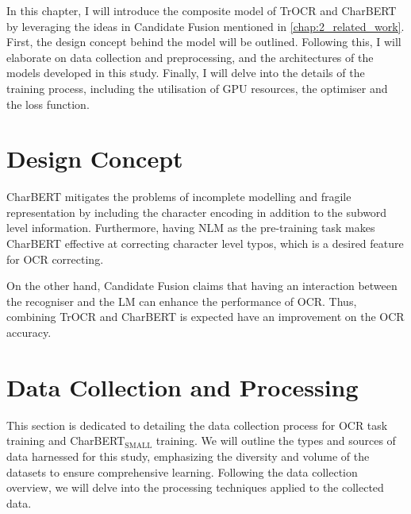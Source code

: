 \label{chap:3_method}
In this chapter, I will introduce the composite model of TrOCR and CharBERT by leveraging the ideas in Candidate Fusion mentioned in \autoref{chap:2_related_work}. First, the design concept behind the model will be outlined. Following this, I will elaborate on data collection and preprocessing, and the architectures of the models developed in this study. Finally, I will delve into the details of the training process, including the utilisation of GPU resources, the optimiser and the loss function.
\section{Design Concept}
\label{sec:3_design_concept}
CharBERT mitigates the problems of incomplete modelling and fragile representation by including the character encoding in addition to the subword level information. Furthermore, having NLM as the pre-training task makes CharBERT effective at correcting character level typos, which is a desired feature for OCR correcting. 

On the other hand, Candidate Fusion claims that having an interaction between the recogniser and the LM can enhance the performance of OCR. Thus, combining TrOCR and CharBERT is expected have an improvement on the OCR accuracy. 

\section{Data Collection and Processing}
\label{sec:3_data_collection_and_processing}
This section is dedicated to detailing the data collection process for OCR task training and CharBERT$_{\text{SMALL}}$ training. We will outline the types and sources of data harnessed for this study, emphasizing the diversity and volume of the datasets to ensure comprehensive learning. Following the data collection overview, we will delve into the processing techniques applied to the collected data.
